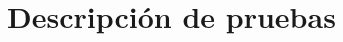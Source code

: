 \documentclass[../Main.tex]{subfiles}
\begin{document}
    \section{Descripción de pruebas}
\end{document}
